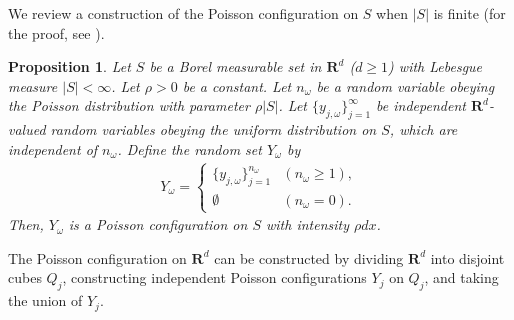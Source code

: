 \documentclass[12pt,a4paper]{article}
\newtheorem{proposition}[theorem]{Proposition}
\begin{document}
We review a construction of the Poisson configuration on $S$
when $|S|$ is finite
(for the proof, see \cite[Theorem 1.2.1]{Re}).

\begin{proposition}
\label{prop_poisson_construction}
Let $S$ be a Borel measurable set in $\mathbf{R}^d$ ($d \geq 1$)
with Lebesgue measure $|S|<\infty$.
Let $\rho>0$ be a constant.
Let $n_\omega$ be a random variable 
obeying the Poisson distribution with parameter $\rho|S|$.
Let $\{y_{j,\omega}\}_{j=1}^\infty$ be independent $\mathbf{R}^d$-valued 
random variables obeying the uniform distribution on $S$,
which are independent of $n_\omega$.
Define the random set $Y_\omega$ by
\begin{align*}
 Y_\omega = 
\begin{cases}
\{y_{j,\omega}\}_{j=1}^{n_\omega} & (n_\omega\geq 1), \\
\emptyset & (n_\omega=0).
\end{cases}
\end{align*}
Then, $Y_\omega$ is a Poisson configuration on $S$ with intensity
$\rho dx$.
\end{proposition}
The Poisson configuration on $\mathbf{R}^d$ can be constructed
by dividing $\mathbf{R}^d$ into disjoint cubes $Q_j$,
constructing independent Poisson configurations $Y_j$  on $Q_j$,
and taking the union of $Y_j$.
\end{document}
